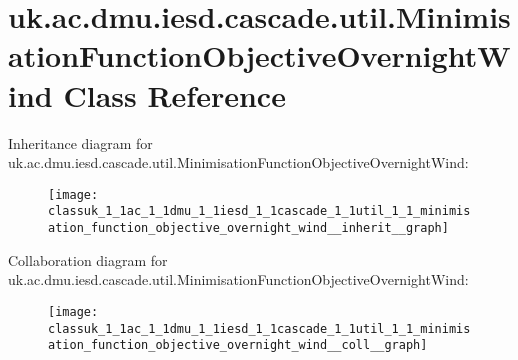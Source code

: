 \hypertarget{classuk_1_1ac_1_1dmu_1_1iesd_1_1cascade_1_1util_1_1_minimisation_function_objective_overnight_wind}{\section{uk.\-ac.\-dmu.\-iesd.\-cascade.\-util.\-Minimisation\-Function\-Objective\-Overnight\-Wind Class Reference}
\label{classuk_1_1ac_1_1dmu_1_1iesd_1_1cascade_1_1util_1_1_minimisation_function_objective_overnight_wind}
}


Inheritance diagram for uk.\-ac.\-dmu.\-iesd.\-cascade.\-util.\-Minimisation\-Function\-Objective\-Overnight\-Wind\-:\nopagebreak
\begin{figure}[H]
\begin{center}
\leavevmode
\texttt{[image: classuk\_1\_1ac\_1\_1dmu\_1\_1iesd\_1\_1cascade\_1\_1util\_1\_1\_minimisation\_function\_objective\_overnight\_wind\_\_inherit\_\_graph]}
\end{center}
\end{figure}


Collaboration diagram for uk.\-ac.\-dmu.\-iesd.\-cascade.\-util.\-Minimisation\-Function\-Objective\-Overnight\-Wind\-:\nopagebreak
\begin{figure}[H]
\begin{center}
\leavevmode
\texttt{[image: classuk\_1\_1ac\_1\_1dmu\_1\_1iesd\_1\_1cascade\_1\_1util\_1\_1\_minimisation\_function\_objective\_overnight\_wind\_\_coll\_\_graph]}
\end{center}
\end{figure}
